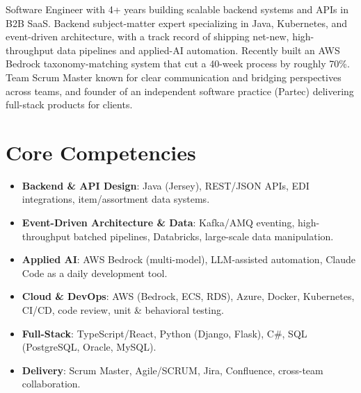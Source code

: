 \documentclass[11pt,a4paper,sans]{moderncv}
\begin{document}
\makecvtitle


\vspace{6pt}
\small{Software Engineer with 4+ years building scalable backend systems and APIs in B2B SaaS. Backend subject-matter expert specializing in Java, Kubernetes, and event-driven architecture, with a track record of shipping net-new, high-throughput data pipelines and applied-AI automation. Recently built an AWS Bedrock taxonomy-matching system that cut a 40-week process by roughly 70\%. Team Scrum Master known for clear communication and bridging perspectives across teams, and founder of an independent software practice (Partec) delivering full-stack products for clients.}


\section{Core Competencies}
\vspace{1pt}
\begin{itemize}

\item \textbf{Backend \& API Design}: Java (Jersey), REST/JSON APIs, EDI integrations, item/assortment data systems.

\item \textbf{Event-Driven Architecture \& Data}: Kafka/AMQ eventing, high-throughput batched pipelines, Databricks, large-scale data manipulation.

\item \textbf{Applied AI}: AWS Bedrock (multi-model), LLM-assisted automation, Claude Code as a daily development tool.

\item \textbf{Cloud \& DevOps}: AWS (Bedrock, ECS, RDS), Azure, Docker, Kubernetes, CI/CD, code review, unit \& behavioral testing.

\item \textbf{Full-Stack}: TypeScript/React, Python (Django, Flask), C\#, SQL (PostgreSQL, Oracle, MySQL).

\item \textbf{Delivery}: Scrum Master, Agile/SCRUM, Jira, Confluence, cross-team collaboration.

\end{itemize}
\end{document}
